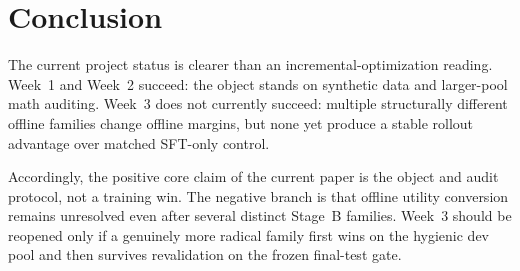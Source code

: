 \section{Conclusion}

The current project status is clearer than an incremental-optimization reading. Week~1 and Week~2 succeed: the object stands on synthetic data and larger-pool math auditing. Week~3 does not currently succeed: multiple structurally different offline families change offline margins, but none yet produce a stable rollout advantage over matched SFT-only control.

Accordingly, the positive core claim of the current paper is the object and audit protocol, not a training win. The negative branch is that offline utility conversion remains unresolved even after several distinct Stage~B families. Week~3 should be reopened only if a genuinely more radical family first wins on the hygienic dev pool and then survives revalidation on the frozen final-test gate.
